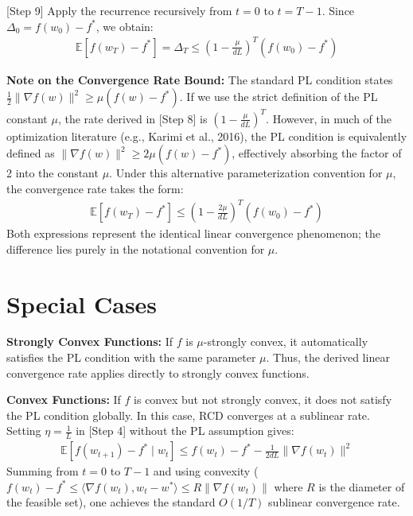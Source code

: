 \documentclass{article}
\begin{document}
[Step 9] Apply the recurrence recursively from $t=0$ to $t=T-1$. Since $\Delta_0 = f(w_0) - f^*$, we obtain:
\begin{align*}
\mathbb{E}[f(w_T) - f^*] = \Delta_T \leq \left( 1 - \frac{\mu}{dL} \right)^T (f(w_0) - f^*)
\end{align*}

\textbf{Note on the Convergence Rate Bound:} 
The standard PL condition states $\frac{1}{2}\|\nabla f(w)\|^2 \geq \mu(f(w) - f^*)$. If we use the strict definition of the PL constant $\mu$, the rate derived in [Step 8] is $(1 - \frac{\mu}{dL})^T$. 
However, in much of the optimization literature (e.g., Karimi et al., 2016), the PL condition is equivalently defined as $\|\nabla f(w)\|^2 \geq 2\mu(f(w) - f^*)$, effectively absorbing the factor of 2 into the constant $\mu$. Under this alternative parameterization convention for $\mu$, the convergence rate takes the form:
\begin{align*}
\mathbb{E}[f(w_T) - f^*] \leq \left( 1 - \frac{2\mu}{dL} \right)^T (f(w_0) - f^*)
\end{align*}
Both expressions represent the identical linear convergence phenomenon; the difference lies purely in the notational convention for $\mu$.

\section*{Special Cases}
\textbf{Strongly Convex Functions:} If $f$ is $\mu$-strongly convex, it automatically satisfies the PL condition with the same parameter $\mu$. Thus, the derived linear convergence rate applies directly to strongly convex functions.

\textbf{Convex Functions:} If $f$ is convex but not strongly convex, it does not satisfy the PL condition globally. In this case, RCD converges at a sublinear rate. Setting $\eta = \frac{1}{L}$ in [Step 4] without the PL assumption gives:
\begin{align*}
\mathbb{E}[f(w_{t+1}) - f^* \mid w_t] \leq f(w_t) - f^* - \frac{1}{2dL} \|\nabla f(w_t)\|^2
\end{align*}
Summing from $t=0$ to $T-1$ and using convexity ($f(w_t) - f^* \leq \langle \nabla f(w_t), w_t - w^* \rangle \leq R \|\nabla f(w_t)\|$ where $R$ is the diameter of the feasible set), one achieves the standard $O(1/T)$ sublinear convergence rate.
\end{document}
